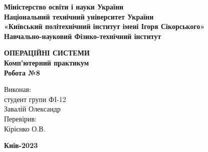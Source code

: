 \documentclass[a4paper,12pt]{article}
\begin{document}
    \pagestyle{fancy}
    \fancyhead{}
    \begin{center}
        \large{\textbf{Міністерство освіти і науки України\\
                Національний технічний університет України\\
                «Київський політехнічний інститут імені Ігоря Сікорського»\\
                Навчально-науковий Фізико-технічний інститут}}\\
        \hfill \break \hfill \break \hfill\break \hfill \break \hfill \break \hfill \break \hfill \break
        \hfill \break \hfill \break \hfill \break
        \begin{center}
            \normalsize{\textbf{ОПЕРАЦІЙНІ СИСТЕМИ\\
            Комп’ютерний практикум\\
            Робота №8}}
        \end{center}
    \end{center}
    \hfill \break \hfill \break \hfill \break \hfill \break \hfill \break \hfill \break \hfill \break
    \hfill \break \hfill \break \hfill \break \hfill \break 
    \begin{flushright}
        \large{ \hspace{35pt} Виконав:\\
            студент групи ФI-12\\
            Завалій Олександр\\} 
        \large{ \hspace{35pt} Перевірив:\\
        Кірієнко О.В.} 
    \end{flushright}
    \hfill \break \hfill \break \hfill \break \hfill \break \hfill \break \hfill \break \hfill \break
    \hfill \break
    \begin{center} \textbf{Київ-2023} \end{center}
    \thispagestyle{empty}
\end{document}
